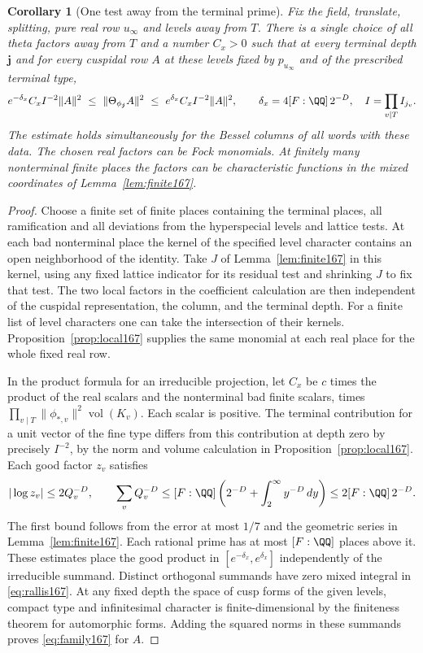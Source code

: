\documentclass[a4paper,11pt]{article}
\newtheorem{corollary}[proposition]{Corollary}
\theoremstyle{definition}
\theoremstyle{remark}
\numberwithin{equation}{section}
\begin{document}
\begin{corollary}[One test away from the terminal prime]
\label{cor:uniform167}
Fix the field, translate, splitting, pure real row \(u_\infty\)
and levels away from \(T\). There is a single choice of all
theta factors away from \(T\) and a number \(C_x>0\) such
that at every terminal depth \(\boldsymbol j\) and for every
cuspidal row \(A\) at these levels fixed by \(p_{u_\infty}\)
and of the prescribed terminal type,
\begin{equation}
  e^{-\delta_x} C_x I^{-2}\|A\|^2
    \ \le\ \|\Theta_{\phi_{\boldsymbol j}} A\|^2
    \ \le\ e^{\delta_x} C_x I^{-2}\|A\|^2,\qquad
  \delta_x=4[F:\QQ]\,2^{-D},\quad I=\prod_{v\mid T} I_{j_v}.
  \label{eq:family167}
\end{equation}
The estimate holds simultaneously for the Bessel columns of
all words with these data. The chosen real factors can be
Fock monomials. At finitely many nonterminal finite places
the factors can be characteristic functions in the mixed
coordinates of Lemma~\ref{lem:finite167}.
\end{corollary}
\begin{proof}
Choose a finite set of finite places containing the terminal
places, all ramification and all deviations from the
hyperspecial levels and lattice tests. At each bad nonterminal
place the kernel of the specified level character contains
an open neighborhood of the identity. Take \(J\) of
Lemma~\ref{lem:finite167} in this kernel, using any fixed
lattice indicator for its residual test and shrinking \(J\)
to fix that test. The two local factors in the coefficient
calculation are then independent of the cuspidal representation,
the column, and the terminal depth. For a finite list of level
characters one can take the intersection of their kernels.
Proposition~\ref{prop:local167} supplies the same monomial at
each real place for the whole fixed real row.

In the product formula for an irreducible projection, let
\(C_x\) be \(c\) times the product of the real scalars and
the nonterminal bad finite scalars, times
\(\prod_{v\mid T}\|\phi_{*,v}\|^2\operatorname{vol}(K_v)\).
Each scalar is positive. The terminal contribution for a unit
vector of the fine type differs from this contribution at
depth zero by precisely \(I^{-2}\), by the norm and volume
calculation in Proposition~\ref{prop:local167}. Each good
factor \(z_v\) satisfies
\[
   |\log z_v|\le 2Q_v^{-D},\qquad
   \sum_v Q_v^{-D}\le [F:\QQ]
       \left(2^{-D}+\int_2^\infty y^{-D}\,dy\right)
                         \le 2[F:\QQ]\,2^{-D}.
\]
The first bound follows from the error at most \(1/7\) and
the geometric series in Lemma~\ref{lem:finite167}. Each
rational prime has at most \([F:\QQ]\) places above it.
These estimates place the good product in
\([e^{-\delta_x},e^{\delta_x}]\) independently of the
irreducible summand. Distinct orthogonal summands have zero
mixed integral in \eqref{eq:rallis167}. At any fixed depth
the space of cusp forms of the given levels, compact type and
infinitesimal character is finite-dimensional by the finiteness
theorem for automorphic forms. Adding the squared norms in
these summands proves \eqref{eq:family167} for \(A\).
\end{proof}
\end{document}
